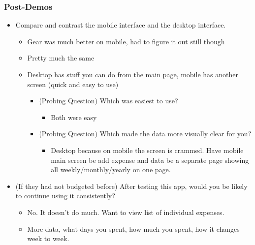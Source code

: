 \documentclass{chi2011}
\begin{document}
	\subsubsection{Post-Demos}
	\begin{itemize}[noitemsep]
		\item Compare and contrast the mobile interface and the desktop interface.
		\begin{itemize}[noitemsep]
			\item Gear was much better on mobile, had to figure it out still though
			\item Pretty much the same
			\item Desktop has stuff you can do from the main page, mobile has another screen (quick and easy to
				  use)
			\begin{itemize}[noitemsep]
				\item (Probing Question) Which was easiest to use?
				\begin{itemize}[noitemsep]
					\item Both were easy
				\end{itemize}
			\item (Probing Question) Which made the data more visually clear for you?
				\begin{itemize}[noitemsep]
					\item Desktop because on mobile the screen is crammed. Have mobile main screen be add expense and data be a separate page showing all 
						  weekly/monthly/yearly on one page.
				\end{itemize}
			\end{itemize}
		\end{itemize}

		\item (If they had not budgeted before) After testing this app, would you be likely to continue using it consistently? 
		\begin{itemize}[noitemsep]
			\item No. It doesn't do much. Want to view list of individual expenses.
			\item More data, what days you spent, how much you spent, how it changes week to week.
		\end{itemize}
	\end{itemize}


\newpage
\printbibliography
\end{document}
